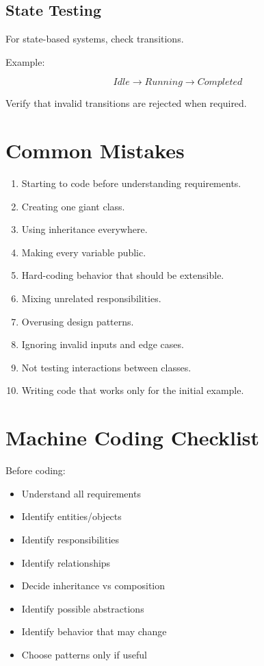 \documentclass[12pt,a4paper]{article}
\begin{document}
\subsection{State Testing}

For state-based systems, check transitions.

Example:

\[
Idle \rightarrow Running \rightarrow Completed
\]

Verify that invalid transitions are rejected when required.

\section{Common Mistakes}

\begin{enumerate}
\item Starting to code before understanding requirements.
\item Creating one giant class.
\item Using inheritance everywhere.
\item Making every variable public.
\item Hard-coding behavior that should be extensible.
\item Mixing unrelated responsibilities.
\item Overusing design patterns.
\item Ignoring invalid inputs and edge cases.
\item Not testing interactions between classes.
\item Writing code that works only for the initial example.
\end{enumerate}

\section{Machine Coding Checklist}

Before coding:

\begin{itemize}[label=$\square$]
\item Understand all requirements
\item Identify entities/objects
\item Identify responsibilities
\item Identify relationships
\item Decide inheritance vs composition
\item Identify possible abstractions
\item Identify behavior that may change
\item Choose patterns only if useful
\end{itemize}
\end{document}

